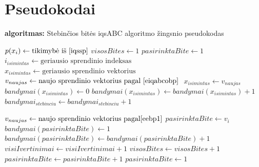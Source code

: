 \documentclass{VUMIFPSmagistrinis}
\begin{document}
\section{Pseudokodai}\label{PR5pseudo}


\begin{algorithm}[H]
\caption{\textbf{algoritmas:} Stebinčios bitės iqsABC algoritmo žingsnio pseudokodas}
\begin{spacing}{1.0}
\begin{algorithmic}[1]
        \State $p(x_i) \gets \text{tikimybė iš \eqref{iqssp}}$
    \EndFor
    \State $visosBites \gets 1$
    \State $pasirinktaBite \gets 1$
                \State $i_{isimintas} \gets \text{geriausio sprendinio indeksas} $
                \State $x_{isimintas} \gets  \text{geriausio sprendinio vektorius} $
                \State $v_{naujas} \gets \text{naujo sprendinio vektorius pagal \eqref{eiqabcobp} } $
                    \State $x_{isimintas} \gets v_{naujas}$
                    \State $bandymai(x_{isimintas}) \gets 0$
                \Else
                    \State $bandymai(x_{isimintas}) \gets bandymai(x_{isimintas})+1$
                    \State $bandymai_{stebinciu} \gets bandymai_{stebinciu}+1$
                \EndIf
                

            \Else      
                \State $v_{naujas} \gets \text{naujo sprendinio vektorius pagal} \eqref{eebp1}$
                    \State $pasirinktaBite \gets v_{i} $
                    \State $bandymai(pasirinktaBite) \gets 1$
                \Else
                    \State $bandymai(pasirinktaBite) \gets bandymai(pasirinktaBite)+1$
                \EndIf
            \EndIf
        \State $visiIvertinimai \gets visiIvertinimai + 1$
        \State $visosBites \gets visosBites + 1$
        \EndIf
        \State $pasirinktaBite \gets pasirinktaBite+1$
            \State $pasirinktaBite \gets 1$
        \EndIf
    \EndWhile
\end{algorithmic}
\end{spacing}
\label{alg:1}
\end{algorithm}
\end{document}
